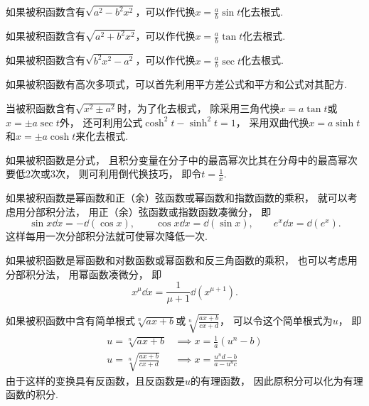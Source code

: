 如果被积函数含有\(\sqrt{a^2 - b^2 x^2}\)，可以作代换\(x = \frac{a}{b} \sin t\)化去根式.

如果被积函数含有\(\sqrt{a^2 + b^2 x^2}\)，可以作代换\(x = \frac{a}{b} \tan t\)化去根式.

如果被积函数含有\(\sqrt{b^2 x^2 - a^2}\)，可以作代换\(x = \frac{a}{b} \sec t\)化去根式.

如果被积函数有高次多项式，可以首先利用平方差公式和平方和公式对其配方.

当被积函数含有\(\sqrt{x^2 \pm a^2}\)时，为了化去根式，
除采用三角代换\(x = a \tan t\)或\(x = \pm a \sec t\)外，
还可利用公式\(\cosh^2 t - \sinh^2 t = 1\)，
采用双曲代换\(x = a \sinh t\)和\(x = \pm a \cosh t\)来化去根式.

如果被积函数是分式，
且积分变量在分子中的最高幂次比其在分母中的最高幂次要低2次或3次，
则可利用倒代换技巧，
即令\(t=\frac{1}{x}\).

如果被积函数是幂函数和正（余）弦函数或幂函数和指数函数的乘积，
就可以考虑用分部积分法，
用正（余）弦函数或指数函数凑微分，
即\begin{equation*}
	\sin x \dd{x} = -\dd(\cos x),
	\qquad
	\cos x \dd{x} = \dd(\sin x),
	\qquad
	e^x \dd{x} = \dd(e^x).
\end{equation*}
这样每用一次分部积分法就可使幂次降低一次.

如果被积函数是幂函数和对数函数或幂函数和反三角函数的乘积，
也可以考虑用分部积分法，
用幂函数凑微分，
即\begin{equation*}
	x^\mu \dd{x} = \frac1{\mu+1} \dd(x^{\mu+1}).
\end{equation*}


如果被积函数中含有简单根式\(\sqrt[n]{ax+b}\)或\(\sqrt[n]{\frac{ax+b}{cx+d}}\)，
可以令这个简单根式为\(u\)，
即\begin{align*}
	u=\sqrt[n]{ax+b} &\implies x=\frac{1}{a}(u^n-b) \\
	u=\sqrt[n]{\frac{ax+b}{cx+d}} &\implies x=\frac{u^nd-b}{a-u^nc}
\end{align*}
由于这样的变换具有反函数，且反函数是\(u\)的有理函数，
因此原积分可以化为有理函数的积分.
